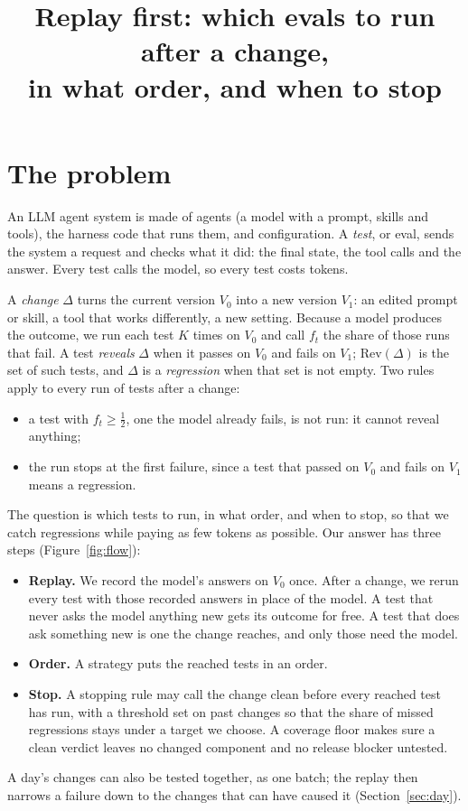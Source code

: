 \documentclass[11pt,a4paper]{article}
\title{Replay first: which evals to run after a change,\\ in what order, and when to stop}
\date{}
\begin{document}
\maketitle
\vspace{-1.5cm}

\section{The problem}

An LLM agent system is made of agents (a model with a prompt, skills and tools), the harness code that runs them,
and configuration. A \emph{test}, or eval, sends the system a request and checks what it did: the final state, the
tool calls and the answer. Every test calls the model, so every test costs tokens.

A \emph{change} $\Delta$ turns the current version $V_0$ into a new version $V_1$: an edited prompt or skill, a tool
that works differently, a new setting. Because a model produces the outcome, we run each test $K$ times on $V_0$
and call $f_t$ the share of those runs that fail. A test \emph{reveals} $\Delta$ when it passes on $V_0$ and fails
on $V_1$; $\mathrm{Rev}(\Delta)$ is the set of such tests, and $\Delta$ is a \emph{regression} when that set is not
empty. Two rules apply to every run of tests after a change:
\begin{itemize}
  \item a test with $f_t \ge \frac12$, one the model already fails, is not run: it cannot reveal anything;
  \item the run stops at the first failure, since a test that passed on $V_0$ and fails on $V_1$ means a regression.
\end{itemize}

The question is which tests to run, in what order, and when to stop, so that we catch regressions while paying as
few tokens as possible. Our answer has three steps (Figure~\ref{fig:flow}):
\begin{itemize}
  \item \textbf{Replay.} We record the model's answers on $V_0$ once. After a change, we rerun every test with those
        recorded answers in place of the model. A test that never asks the model anything new gets its outcome for
        free. A test that does ask something new is one the change reaches, and only those need the model.
  \item \textbf{Order.} A strategy puts the reached tests in an order.
  \item \textbf{Stop.} A stopping rule may call the change clean before every reached test has run, with a
        threshold set on past changes so that the share of missed regressions stays under a target we choose. A
        coverage floor makes sure a clean verdict leaves no changed component and no release blocker untested.
\end{itemize}
A day's changes can also be tested together, as one batch; the replay then narrows a failure down to the changes
that can have caused it (Section~\ref{sec:day}).
\end{document}
